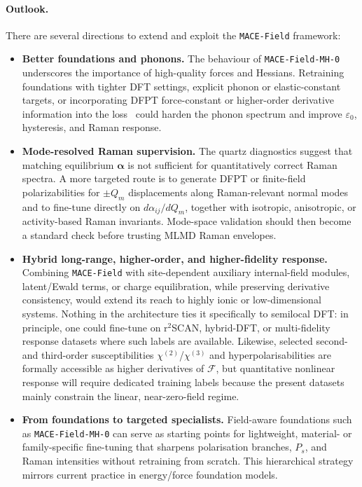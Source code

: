 \documentclass[aps,physrev,graphicx,amsmath,amssymb,
               reprint,superscriptaddress]{revtex4-2}
\begin{document}
\paragraph*{Outlook.}
There are several directions to extend and exploit the \texttt{MACE-Field} framework:
\begin{itemize}
  \item \textbf{Better foundations and phonons.}
  The behaviour of \texttt{MACE-Field-MH-0} underscores the importance of high-quality forces and Hessians.
  Retraining foundations with tighter DFT settings, explicit phonon or elastic-constant targets, or
  incorporating DFPT force-constant or higher-order derivative information into the loss~\cite{Gonnheimer2025} could harden the phonon spectrum and
  improve $\varepsilon_0$, hysteresis, and Raman response.

  \item \textbf{Mode-resolved Raman supervision.}
  The quartz diagnostics suggest that matching equilibrium $\boldsymbol\alpha$ is not sufficient for quantitatively correct Raman spectra. A more targeted route is to generate DFPT or finite-field polarizabilities for $\pm Q_m$ displacements along Raman-relevant normal modes and to fine-tune directly on $d\alpha_{ij}/dQ_m$, together with isotropic, anisotropic, or activity-based Raman invariants. Mode-space validation should then become a standard check before trusting MLMD Raman envelopes.

  \item \textbf{Hybrid long-range, higher-order, and higher-fidelity response.}
  Combining \texttt{MACE-Field} with site-dependent auxiliary internal-field modules, latent/Ewald terms, or charge equilibration, while preserving derivative consistency, would extend its reach to highly ionic or low-dimensional systems. Nothing in the architecture ties it specifically to semilocal DFT: in principle, one could fine-tune on r$^2$SCAN, hybrid-DFT, or multi-fidelity response datasets where such labels are available. Likewise, selected second- and third-order susceptibilities $\chi^{(2)}$/$\chi^{(3)}$ and hyperpolarisabilities are formally accessible as higher derivatives of $\mathcal F$, but quantitative nonlinear response will require dedicated training labels because the present datasets mainly constrain the linear, near-zero-field regime.

  \item \textbf{From foundations to targeted specialists.}
  Field-aware foundations such as \texttt{MACE-Field-MH-0} can serve as starting points for lightweight,
  material- or family-specific fine-tuning that sharpens polarisation branches, $P_s$, and Raman
  intensities without retraining from scratch. This hierarchical strategy mirrors current practice in
  energy/force foundation models.


\end{itemize}
\end{document}
